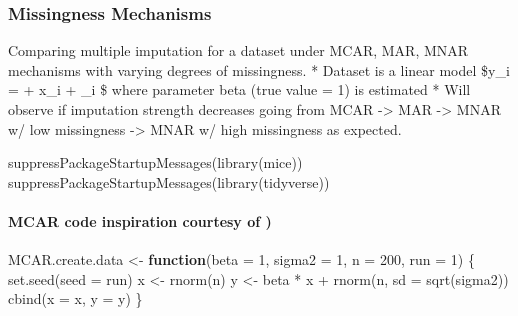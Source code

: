 \documentclass[
]{article}
\author{}
\date{\vspace{-2.5em}}
\newenvironment{Shaded}{\begin{snugshade}}{\end{snugshade}}
\newcommand{\AttributeTok}[1]{\textcolor[rgb]{0.77,0.63,0.00}{#1}}
\newcommand{\ControlFlowTok}[1]{\textcolor[rgb]{0.13,0.29,0.53}{\textbf{#1}}}
\newcommand{\DecValTok}[1]{\textcolor[rgb]{0.00,0.00,0.81}{#1}}
\newcommand{\FunctionTok}[1]{\textcolor[rgb]{0.00,0.00,0.00}{#1}}
\newcommand{\NormalTok}[1]{#1}
\newcommand{\OtherTok}[1]{\textcolor[rgb]{0.56,0.35,0.01}{#1}}
\newcommand{\SpecialCharTok}[1]{\textcolor[rgb]{0.00,0.00,0.00}{#1}}
\begin{document}
\hypertarget{missingness-mechanisms}{%
\subsubsection{Missingness Mechanisms}\label{missingness-mechanisms}}

Comparing multiple imputation for a dataset under MCAR, MAR, MNAR
mechanisms with varying degrees of missingness. * Dataset is a linear
model \$y\_i = \alpha + x\_i \beta + \epsilon\_i \$ where parameter beta
(true value = 1) is estimated * Will observe if imputation strength
decreases going from MCAR -\textgreater{} MAR -\textgreater{} MNAR w/
low missingness -\textgreater{} MNAR w/ high missingness as expected.

\begin{Shaded}
\begin{Highlighting}[]
\FunctionTok{suppressPackageStartupMessages}\NormalTok{(}\FunctionTok{library}\NormalTok{(mice))}
\FunctionTok{suppressPackageStartupMessages}\NormalTok{(}\FunctionTok{library}\NormalTok{(tidyverse))}
\end{Highlighting}
\end{Shaded}

\hypertarget{mcar-code-inspiration-courtesy-of}{%
\paragraph{\texorpdfstring{MCAR code inspiration courtesy of
\href{https://stefvanbuuren.name/fimd/sec-evaluation.html}{})}{MCAR code inspiration courtesy of )}}\label{mcar-code-inspiration-courtesy-of}}

\begin{Shaded}
\begin{Highlighting}[]
\NormalTok{MCAR.create.data }\OtherTok{\textless{}{-}} \ControlFlowTok{function}\NormalTok{(}\AttributeTok{beta =} \DecValTok{1}\NormalTok{, }\AttributeTok{sigma2 =} \DecValTok{1}\NormalTok{, }\AttributeTok{n =} \DecValTok{200}\NormalTok{,}
                        \AttributeTok{run =} \DecValTok{1}\NormalTok{) \{}
  \FunctionTok{set.seed}\NormalTok{(}\AttributeTok{seed =}\NormalTok{ run)}
\NormalTok{  x }\OtherTok{\textless{}{-}} \FunctionTok{rnorm}\NormalTok{(n)}
\NormalTok{  y }\OtherTok{\textless{}{-}}\NormalTok{ beta }\SpecialCharTok{*}\NormalTok{ x }\SpecialCharTok{+} \FunctionTok{rnorm}\NormalTok{(n, }\AttributeTok{sd =} \FunctionTok{sqrt}\NormalTok{(sigma2))}
  \FunctionTok{cbind}\NormalTok{(}\AttributeTok{x =}\NormalTok{ x, }\AttributeTok{y =}\NormalTok{ y)}
\NormalTok{\}}
\end{Highlighting}
\end{Shaded}
\end{document}
